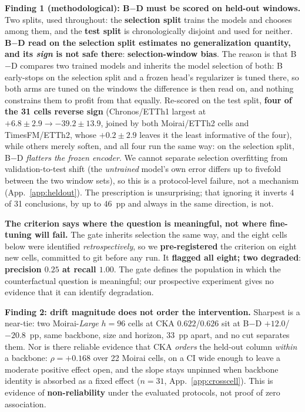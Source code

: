 \documentclass{article}
\begin{document}
\textbf{Finding 1 (methodological): B$-$D must be scored on held-out windows.}
Two splits, used throughout: the \textbf{selection split} trains the models and chooses among them, and the \textbf{test split} is chronologically disjoint and used for neither. \textbf{B$-$D read on the selection split estimates no generalization quantity, and its \emph{sign} is not safe there}: \textbf{selection-window bias}. The reason is that B$-$D compares two trained models and inherits the model selection of both: B early-stops on the selection split and a frozen head's regularizer is tuned there, so both arms are tuned on the windows the difference is then read on, and nothing constrains them to profit from that equally. Re-scored on the test split, \textbf{four of the 31 cells reverse sign} (Chronos/ETTh1 largest at $+6.8{\pm}2.9 \to -39.2{\pm}13.9$, joined by both Moirai/ETTh2 cells and TimesFM/ETTh2, whose $+0.2{\pm}2.9$ leaves it the least informative of the four), while others merely soften, and all four run the same way: on the selection split, B$-$D \emph{flatters the frozen encoder}. We cannot separate selection overfitting from validation-to-test shift (the \emph{untrained} model's own error differs up to fivefold between the two window sets), so this is a protocol-level failure, not a mechanism (App.~\ref{app:heldout}). The prescription is unsurprising; that ignoring it inverts 4 of 31 conclusions, by up to $46$~pp and always in the same direction, is not.

\textbf{The criterion says where the question is meaningful, not where fine-tuning will fail.}
The gate inherits selection the same way, and the eight cells below were identified \emph{retrospectively}, so we \textbf{pre-registered} the criterion on eight new cells, committed to git before any run. It \textbf{flagged all eight; two degraded}: \textbf{precision $0.25$ at recall $1.00$}. The gate defines the population in which the counterfactual question is meaningful; our prospective experiment gives no evidence that it can identify degradation.

\textbf{Finding 2: drift magnitude does not order the intervention.}
Sharpest is a near-tie: two Moirai-\emph{Large} $h{=}96$ cells at CKA $0.622$/$0.626$ sit at B$-$D
${+}12.0$/${-}20.8$~pp, same backbone, size and horizon, $33$~pp apart, and no cut separates them.
Nor is there reliable evidence that CKA \emph{orders} the held-out column \emph{within} a
backbone: $\rho{=}+0.168$ over 22 Moirai cells, on a CI wide enough to leave a moderate positive
effect open, and the slope stays unpinned when backbone identity is absorbed as a fixed effect
($n{=}31$, App.~\ref{app:crosscell}). This is evidence of \textbf{non-reliability} under the evaluated
protocols, not proof of zero association.
\end{document}
